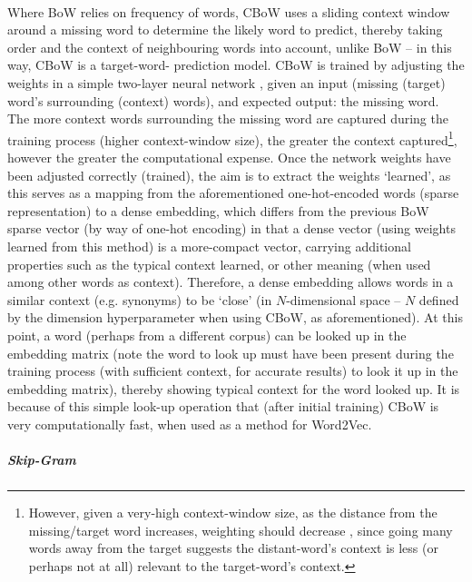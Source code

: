 \\Where BoW relies on frequency of words, CBoW uses a sliding context window around a missing word to determine the likely word to predict, thereby taking order and the context of neighbouring words into account, unlike BoW -- in this way, CBoW is a target-word- prediction model. CBoW is trained by adjusting the weights in a simple two-layer neural network \citep{wikipedia:word2vec}, given an input (missing (target) word's surrounding (context) words), and expected output: the missing word. The more context words surrounding the missing word are captured during the training process (higher context-window size), the greater the context captured\footnote{However, given a very-high context-window size, as the distance from the missing/target word increases, weighting should decrease \citep{arxiv:cbow_sg}, since going many words away from the target suggests the distant-word's context is less (or perhaps not at all) relevant to the target-word's context.}, however the greater the computational expense. Once the network weights have been adjusted correctly (trained), the aim is to extract the weights `learned', as this serves as a mapping from the aforementioned one-hot-encoded words (sparse representation) to a dense embedding, which differs from the previous BoW sparse vector (by way of one-hot encoding) in that a dense vector (using weights learned from this method) is a more-compact vector, carrying additional properties such as the typical context learned, or other meaning (when used among other words as context). Therefore, a dense embedding allows words in a similar context (e.g. synonyms) to be `close' (in $N$-dimensional space -- $N$ defined by the dimension hyperparameter when using CBoW, as aforementioned). At this point, a word (perhaps from a different corpus) can be looked up in the embedding matrix (note the word to look up must have been present during the training process (with sufficient context, for accurate results) to look it up in the embedding matrix), thereby showing typical context for the word looked up. It is because of this simple look-up operation that (after initial training) CBoW is very computationally fast, when used as a method for Word2Vec.
\subparagraph{Skip-Gram}
\noindent
